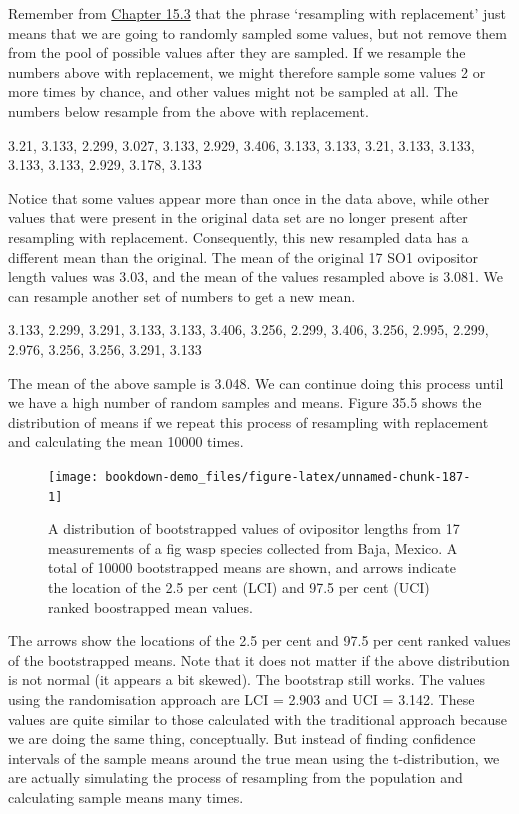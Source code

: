 \documentclass[
]{scrbook}
\begin{document}
Remember from \protect\hyperlink{sampling-with-and-without-replacement}{Chapter 15.3} that the phrase `resampling with replacement' just means that we are going to randomly sampled some values, but not remove them from the pool of possible values after they are sampled.
If we resample the numbers above with replacement, we might therefore sample some values 2 or more times by chance, and other values might not be sampled at all.
The numbers below resample from the above with replacement.

3.21, 3.133, 2.299, 3.027, 3.133, 2.929, 3.406, 3.133, 3.133, 3.21, 3.133, 3.133, 3.133, 3.133, 2.929, 3.178, 3.133

Notice that some values appear more than once in the data above, while other values that were present in the original data set are no longer present after resampling with replacement. Consequently, this new resampled data has a different mean than the original.
The mean of the original 17 SO1 ovipositor length values was 3.03, and the mean of the values resampled above is 3.081.
We can resample another set of numbers to get a new mean.

3.133, 2.299, 3.291, 3.133, 3.133, 3.406, 3.256, 2.299, 3.406, 3.256, 2.995, 2.299, 2.976, 3.256, 3.256, 3.291, 3.133

The mean of the above sample is 3.048.
We can continue doing this process until we have a high number of random samples and means. Figure 35.5 shows the distribution of means if we repeat this process of resampling with replacement and calculating the mean 10000 times.

\begin{figure}
\texttt{[image: bookdown-demo\_files/figure-latex/unnamed-chunk-187-1]} \caption{A distribution of bootstrapped values of ovipositor lengths from 17 measurements of a fig wasp species collected from Baja, Mexico. A total of 10000 bootstrapped means are shown, and arrows indicate the location of the 2.5 per cent (LCI) and 97.5 per cent (UCI) ranked boostrapped mean values.}\label{fig:unnamed-chunk-187}
\end{figure}

The arrows show the locations of the 2.5 per cent and 97.5 per cent ranked values of the bootstrapped means.
Note that it does not matter if the above distribution is not normal (it appears a bit skewed).
The bootstrap still works.
The values using the randomisation approach are LCI = 2.903 and UCI = 3.142.
These values are quite similar to those calculated with the traditional approach because we are doing the same thing, conceptually.
But instead of finding confidence intervals of the sample means around the true mean using the t-distribution, we are actually simulating the process of resampling from the population and calculating sample means many times.
\end{document}
